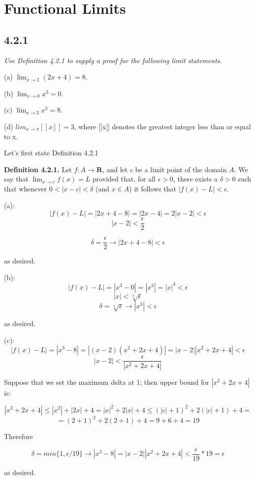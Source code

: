 \documentclass[11pt,oneside,titlepage]{book}
\begin{document}
\section{Functional Limits}

\subsection*{4.2.1}
\textit{Use Definition 4.2.1 to supply a proof for the following limit statements.}

(a) $\lim_{x \to 2}(2x + 4) = 8$.

(b) $\lim_{x\to0} x^3 = 0$.

(c) $\lim_{x\to2} x^3 = 8$.

(d) $lim_{x\to\pi}[[x]] = 3$, where [[x]] denotes the greatest integer less than or
equal to x.

Let's first state Definition 4.2.1

\textbf{Definition 4.2.1.} Let $f : A \to \textbf{R}$, and let $c$ be a limit
point of the domain $A$. We say that $\lim_{x\to c} f(x) = L$ provided
that, for all $\epsilon > 0$, there exists
a $\delta > 0$ such that whenever $0 < |x - c| < \delta$
(and $x \in A$) it follows that $|f(x) - L| < \epsilon$.

(a):
$$ |f(x) - L| = |2 x + 4 - 8| = |2 x - 4| = 2|x - 2| < \epsilon $$
$$ |x-2| < \frac{\epsilon}{2}$$

$$  \delta = \frac{\epsilon}{2} \to |2 x + 4 - 8| < \epsilon $$

as desired.

(b):
$$ |f(x) - L| = |x^3 - 0| = |x^3| = |x|^3 < \epsilon $$
$$ |x| < \sqrt[3]{\epsilon}{} $$
$$ \delta = \sqrt[3]{\epsilon} \to |x^3| < \epsilon $$

as desired.

(c):
$$ |f(x) - L| = |x^3 - 8| = |(x - 2)(x^2 + 2x + 4)| = |x-2||x^2 + 2x + 4| < \epsilon $$
$$|x-2| < \frac{\epsilon}{|x^2 + 2x + 4|} $$

Suppose that we set the maximum delta at 1; then upper bound for $|x^2 + 2x + 4|$ is:

$$ |x^2 + 2x + 4| \leq |x^2| + |2x| + 4 = |x|^2 + 2|x| + 4 \leq (|c| + 1)^2 + 2(|c| + 1) + 4 =$$
$$= (2 + 1)^2 + 2(2 + 1) + 4 = 9 + 6 + 4 = 19
$$

Therefore

$$\delta = min\{1, \epsilon/19\} \to |x^3 - 8| = |x-2||x^2 + 2x + 4| < \frac{\epsilon}{19} * 19 = \epsilon $$

as desired.
\end{document}
